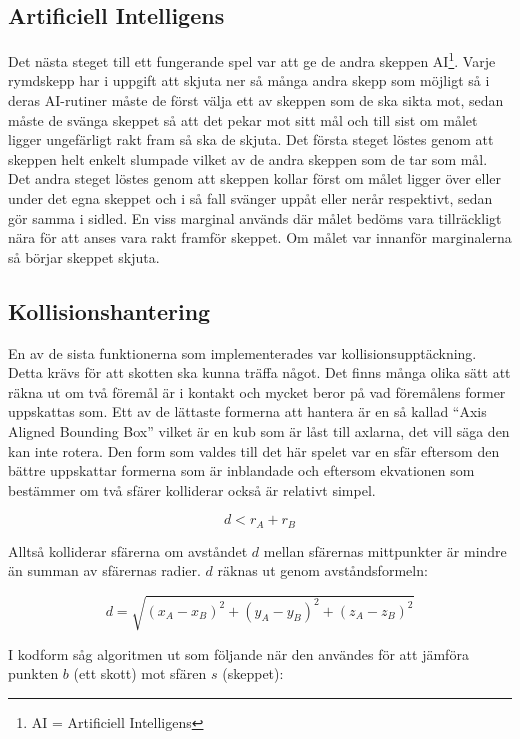 \documentclass[12pt, a4paper]{article}
\begin{document}
	\subsection{Artificiell Intelligens}
	Det nästa steget till ett fungerande spel var att ge de andra skeppen AI\footnote{AI = Artificiell Intelligens}. Varje rymdskepp har i uppgift att skjuta ner så många andra skepp som möjligt så i deras AI-rutiner måste de först välja ett av skeppen som de ska sikta mot, sedan måste de svänga skeppet så att det pekar mot sitt mål och till sist om målet ligger ungefärligt rakt fram så ska de skjuta. Det första steget löstes genom att skeppen helt enkelt slumpade vilket av de andra skeppen som de tar som mål. Det andra steget löstes genom att skeppen kollar först om målet ligger över eller under det egna skeppet och i så fall svänger uppåt eller nerår respektivt, sedan gör samma i sidled. En viss marginal används där målet bedöms vara tillräckligt nära för att anses vara rakt framför skeppet. Om målet var innanför marginalerna så börjar skeppet skjuta. 
	
	\subsection{Kollisionshantering}
	En av de sista funktionerna som implementerades var kollisionsupptäckning. Detta krävs för att skotten ska kunna träffa något. Det finns många olika sätt att räkna ut om två föremål är i kontakt och mycket beror på vad föremålens former uppskattas som. Ett av de lättaste formerna att hantera är en så kallad ``Axis Aligned Bounding Box'' vilket är en kub som är låst till axlarna, det vill säga den kan inte rotera. Den form som valdes till det här spelet var en sfär eftersom den bättre uppskattar formerna som är inblandade och eftersom ekvationen som bestämmer om två sfärer kolliderar också är relativt simpel. 
	
	\begin{equation}
		d < r_A + r_B
	\end{equation}
	
	Alltså kolliderar sfärerna om avståndet $d$ mellan sfärernas mittpunkter är mindre än summan av sfärernas radier. $d$ räknas ut genom avståndsformeln:
	
	\begin{equation}
		d = \sqrt{(x_A - x_B)^2 + (y_A - y_B)^2 + (z_A - z_B)^2}
	\end{equation}
	
	I kodform såg algoritmen ut som följande när den användes för att jämföra punkten $b$ (ett skott) mot sfären $s$ (skeppet):
	
\end{document}
